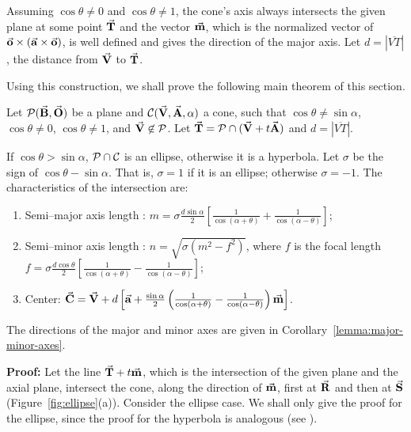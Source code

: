      Assuming $\cos\theta\neq 0$ and $\cos\theta\neq 1$, the cone's axis
always intersects the given plane at some point $\vec{\bf T}$ and the vector
$\vec{\bf m}$, which is the normalized vector of 
$\vec{\bf o}\times(\vec{\bf a}\times\vec{\bf o})$, is well defined and gives the 
direction of the major axis.
Let $d=|\overline{VT}|$, the distance from $\vec{\bf V}$
to $\vec{\bf T}$.

     Using this construction, we shall prove the following main theorem of this
section.

\begin{theorem}
\label{theorem:cone-ellipse}
     Let ${\cal P}(\vec{\bf B},\vec{\bf O})$ be a plane and 
${\cal C}(\vec{\bf V},\vec{\bf A},\alpha)$ a cone, such that
$\cos\theta \neq \sin\alpha$, $\cos\theta\neq 0$, $\cos\theta\neq 1$, 
and $\vec{\bf V}\not\in{\cal P}$.  
Let $\vec{\bf T}={\cal P} \cap (\vec{\bf V}+t\vec{\bf A})$ and
$d = |\overline{VT}|$.

     If $\cos\theta > \sin\alpha$, ${\cal P}\cap{\cal C}$ is an ellipse, 
otherwise it is a hyperbola.  Let $\sigma$ be the sign of 
$\cos\theta - \sin\alpha$.  That is, $\sigma=1$ if it is an ellipse; otherwise
$\sigma=-1$.  The characteristics of the intersection are:
\begin{enumerate}
     \item Semi--major axis length : 
     $m=\sigma\frac{d\sin\alpha}{2}\left[ \frac{1}{\cos(\alpha+\theta)}+
           \frac{1}{\cos(\alpha-\theta)}\right]$;
     \item Semi--minor axis length : $n=\sqrt{\sigma(m^2-f^2)}$, 
     where $f$ is the focal length \\
     $f = \sigma\frac{d\cos\theta}{2}\left[ \frac{1}{\cos(\alpha+\theta)}-
             \frac{1}{\cos(\alpha-\theta)}\right]$;
     \item Center: $\vec{\bf C}=\vec{\bf V}+d\left[\vec{\bf a}+
             \frac{\sin\alpha}{2}\left( \frac{1}{\cos(\alpha+\theta)}-
             \frac{1}{\cos(\alpha-\theta)}\right) \vec{\bf m}\right]$.
\end{enumerate}
The directions of the major and minor axes are given in 
Corollary~\ref{lemma:major-minor-axes}.
\end{theorem}
{\bf Proof:}  Let the line $\vec{\bf T}+t\vec{\bf m}$, which is the intersection of
the given plane and the axial plane, intersect the cone, along the direction 
of $\vec{\bf m}$, first at $\vec{\bf R}$ and then at $\vec{\bf S}$ 
(Figure~\ref{fig:ellipse}(a)).  
\ifFull
Consider the ellipse case.
\else
We shall only give the proof for the ellipse,
since the proof for the hyperbola is analogous (see \cite{JS91}).
